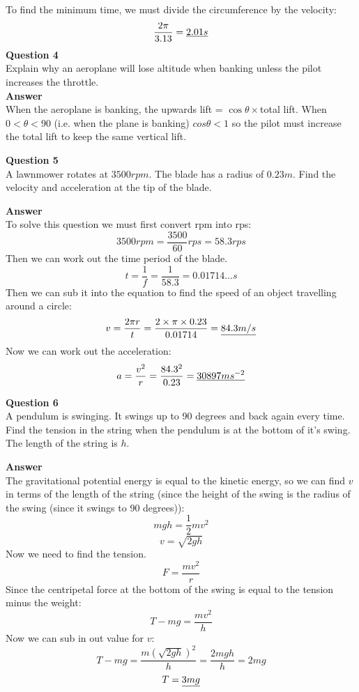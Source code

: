 \documentclass{article}
\begin{document}
To find the minimum time, we must divide the circumference by the velocity: 
	\[
		\frac{2\pi}{3.13} = \uline{2.01s}
	\]
\textbf{Question 4}\\
Explain why an aeroplane will lose altitude when banking unless the pilot increases the throttle.\\

\textbf{Answer}\\
When the aeroplane is banking, the upwards lift = $\cos\theta \times$total lift. When $0 < \theta < 90$ (i.e. when the plane is banking) $cos\theta<1$ so the pilot must increase the total lift to keep the same vertical lift.

\textbf{Question 5}\\
A lawnmower rotates at $3500rpm$. The blade has a radius of $0.23m$. Find the velocity and acceleration at the tip of the blade.

\textbf{Answer}\\
To solve this question we must first convert rpm into rps:
\[
	3500rpm = \frac{3500}{60}rps = 58.3rps
\]
Then we can work out the time period of the blade.
\[
	t = \frac{1}{f} = \frac{1}{58.3} = 0.01714...s
\]
Then we can sub it into the equation to find the speed of an object travelling around a circle:
\[
	v = \frac{2 \pi r}{t} = \frac{2 \times \pi \times 0.23}{0.01714} = \uline{84.3m/s}
\]
Now we can work out the acceleration:
\[
	a = \frac{v^2}{r} = \frac{84.3^2}{0.23} = \uline{30897ms^{-2}}
\]

\textbf{Question 6}\\
A pendulum is swinging. It swings up to 90 degrees and back again every time. Find the tension in the string when the pendulum is at the bottom of it's swing. The length of the string is $h$.

\textbf{Answer}\\
The gravitational potential energy is equal to the kinetic energy, so we can find $v$ in terms of the length of the string (since the height of the swing is the radius of the swing (since it swings to 90 degrees)):
\[
	mgh = \frac{1}{2}mv^2
\]
\[
	v = \sqrt{2gh}
\]
Now we need to find the tension.
\[
	F = \frac{mv^2}{r}
\]
Since the centripetal force at the bottom of the swing is equal to the tension minus the weight:
\[
	T - mg = \frac{mv^2}{h}
\]
Now we can sub in out value for $v$:
\[
	T - mg = \frac{m({\sqrt{2gh}})^2}{h} = \frac{2mgh}{h} = 2mg
\]
\[
	T = \uline{3mg}
\]
\end{document}
